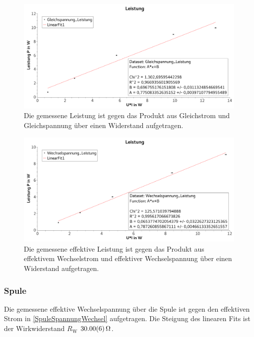 \documentclass[
	a4paper,
	12pt,
	pagesize,
	ngerman
]{scrartcl}
\begin{document}
	\begin{figure}[tb]
		\includegraphics[width=1\textwidth]{WiderLeistungGleich}
		\centering
		\caption{Die gemessene Leistung ist gegen das Produkt aus Gleichstrom und Gleichspannung über einen Widerstand aufgetragen.} %
		\label{WiderLeistungGleich}
		\centering
	\end{figure}
	
	\begin{figure}[tb]
		\includegraphics[width=1\textwidth]{WiderLeistungWechsel}
		\centering
		\caption{Die gemessene effektive Leistung ist gegen das Produkt aus effektivem Wechselstrom und effektiver Wechselspannung über einen Widerstand aufgetragen.}
		\label{WiderLeistungWechsel}
		\centering
	\end{figure}

	\subsubsection*{Spule}
	Die gemessene effektive Wechselspannung über die Spule ist gegen den effektiven Strom in \cref{SpuleSpannungWechsel} aufgetragen.
	Die Steigung des linearen Fits ist der Wirkwiderstand $R_{\text{W}}$ $\SI{30,00 \pm 0,06}{\Omega}$. 
	
\end{document}
